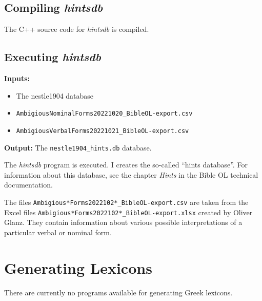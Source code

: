 \documentclass[11pt,oneside,a4paper,article]{memoir}
\begin{document}
\section{Compiling \emph{hintsdb}}

The C++ source code for \emph{hintsdb} is compiled.


\section{Executing \emph{hintsdb}}

\noindent \textbf{Inputs:}
\begin{itemize}
\item The nestle1904 database
\item \texttt{AmbigiousNominalForms20221020\_BibleOL-export.csv}
\item \texttt{AmbigiousVerbalForms20221021\_BibleOL-export.csv}
\end{itemize}

\noindent \textbf{Output:} The \texttt{nestle1904\_hints.db} database.

\vspace{1ex}

\noindent
The \emph{hintsdb} program is executed. I creates the so-called ``hints database''. For information
about this database, see the chapter \emph{Hints} in the Bible OL technical documentation.

The files \texttt{Ambigious*Forms2022102*\_BibleOL-export.csv} are taken from the Excel files
\texttt{Ambigious*Forms2022102*\_BibleOL-export.xlsx} created by Oliver Glanz. They contain information
about various possible interpretations of a particular verbal or nominal form.



\chapter{Generating Lexicons}

There are currently no programs available for generating Greek lexicons.
\end{document}
